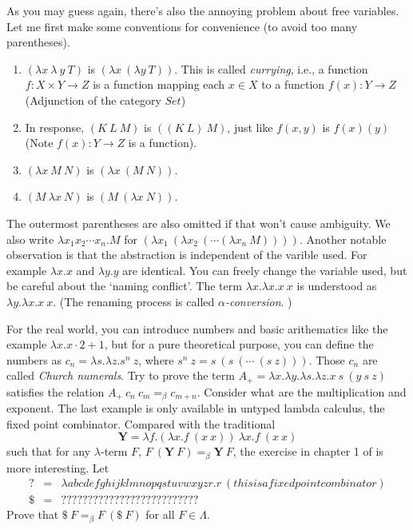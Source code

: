 As you may guess again, there's also the annoying problem about free
variables. Let me first make some conventions for convenience (to
avoid too many parentheses). 
\begin{enumerate}
    \item $(\lambda x\ \lambda\ y\ T)$ is $(\lambda x\ (\lambda y\ T))$.
    This is called {\it currying}, i.e., a function $f: X\times Y\to Z$ is
    a function mapping each $x\in X$ to a function $f(x): Y\to Z$ 
    (Adjunction of the category $Set$)
    \item In response, $(K\ L\ M)$ is $((K\ L)\ M)$, just like $f(x, y)$
    is $f(x)(y)$ (Note $f(x): Y\to Z$ is a function). 
    \item $(\lambda x\ M\ N)$ is $(\lambda x\ (M\ N))$.
    \item $(M\ \lambda x\ N)$ is $(M\ (\lambda x\ N))$.
\end{enumerate}

The outermost parentheses are also omitted if that won't cause ambiguity.
We also write $\lambda x_1 x_2\cdots x_n.M$ for 
$(\lambda x_1\ (\lambda x_2\ (\cdots(\lambda x_n\ M))))$. Another notable
observation is that the abstraction is independent of the varible used.
For example $\lambda x.x$ and $\lambda y.y$ are identical. You can freely
change the variable used, but be careful about the `naming conflict'. 
The term $\lambda x. \lambda x. x\ x$ is understood as 
$\lambda y. \lambda x. x\ x$. (The renaming process is called {\it
$\alpha$-conversion}. )

For the real world, you can introduce numbers and basic arithematics like
the example $\lambda x. x \cdot 2 + 1$, but for a pure theoretical 
purpose, you can define the numbers as $c_n=\lambda s.\lambda z. s^n\ z$, 
where $s^n\ z = s\ (s\ (\cdots\ (s\ z)))$. Those $c_n$ are called {\it
Church numerals}. Try to prove the term $A_+=\lambda x.\lambda y.\lambda s
.\lambda z.x\ s\ (y\ s\ z)$ satisfies the relation 
$A_+\ c_n\ c_m=_\beta c_{m+n}$. Consider what are the multiplication and 
exponent. The last example is only available in untyped lambda calculus,
the fixed point combinator. Compared with the traditional 
\newcommand{\Ycomb}{\mathbf{Y}}
$$\Ycomb = \lambda f.(\lambda x.f\ (x\ x))\ \lambda x.f\ (x\ x)$$
such that for any $\lambda$-term $F$, 
$F\ (\Ycomb\ F)=_\beta \Ycomb\ F$, the exercise in chapter 1 of 
\cite{Curry-Howard} is more interesting. Let
$$
\begin{array}{lll}
    ? &=& \lambda abcdefghijklmnopqstuvwxyzr.r\ (thisisafixedpointcombinator) \\
    \$ &=& ??????????????????????????
\end{array}
$$
Prove that $\$\ F=_\beta F\ (\$\ F)$ for all $F\in\Lambda$.

